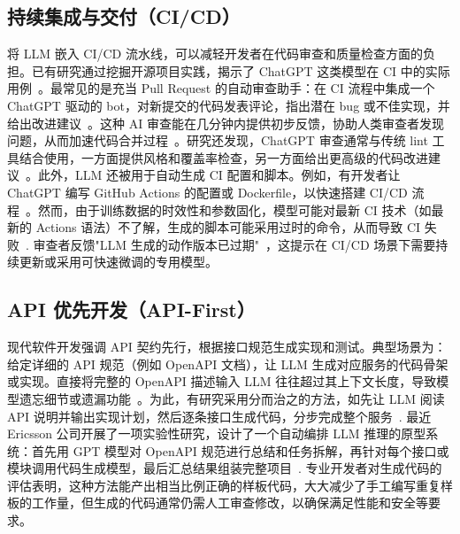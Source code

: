 \subsection{持续集成与交付（CI/CD）}

将 LLM 嵌入 CI/CD 流水线，可以减轻开发者在代码审查和质量检查方面的负担。已有研究通过挖掘开源项目实践，揭示了 ChatGPT 这类模型在 CI 中的实际用例~\cite{ChatGPTUsage2023}。最常见的是充当 Pull Request 的自动审查助手：在 CI 流程中集成一个 ChatGPT 驱动的 bot，对新提交的代码发表评论，指出潜在 bug 或不佳实现，并给出改进建议~\cite{ChatGPTUsage2023}。这种 AI 审查能在几分钟内提供初步反馈，协助人类审查者发现问题，从而加速代码合并过程~\cite{ChatGPTUsage2023}。研究还发现，ChatGPT 审查通常与传统 lint 工具结合使用，一方面提供风格和覆盖率检查，另一方面给出更高级的代码改进建议~\cite{ChatGPTUsage2023}。此外，LLM 还被用于自动生成 CI 配置和脚本。例如，有开发者让 ChatGPT 编写 GitHub Actions 的配置或 Dockerfile，以快速搭建 CI/CD 流程~\cite{ChatGPTUsage2023}。然而，由于训练数据的时效性和参数固化，模型可能对最新 CI 技术（如最新的 Actions 语法）不了解，生成的脚本可能采用过时的命令，从而导致 CI 失败~\cite{ChatGPTUsage2023}. 审查者反馈"LLM 生成的动作版本已过期"~\cite{ChatGPTUsage2023}，这提示在 CI/CD 场景下需要持续更新或采用可快速微调的专用模型。

\subsection{API 优先开发（API-First）}

现代软件开发强调 API 契约先行，根据接口规范生成实现和测试。典型场景为：给定详细的 API 规范（例如 OpenAPI 文档），让 LLM 生成对应服务的代码骨架或实现。直接将完整的 OpenAPI 描述输入 LLM 往往超过其上下文长度，导致模型遗忘细节或遗漏功能~\cite{DivaCopilot}。为此，有研究采用分而治之的方法，如先让 LLM 阅读 API 说明并输出实现计划，然后逐条接口生成代码，分步完成整个服务~\cite{DivaCopilot}. 最近 Ericsson 公司开展了一项实验性研究，设计了一个自动编排 LLM 推理的原型系统：首先用 GPT 模型对 OpenAPI 规范进行总结和任务拆解，再针对每个接口或模块调用代码生成模型，最后汇总结果组装完整项目~\cite{DivaCopilot,DivaCopilot}. 专业开发者对生成代码的评估表明，这种方法能产出相当比例正确的样板代码，大大减少了手工编写重复样板的工作量，但生成的代码通常仍需人工审查修改，以确保满足性能和安全等要求。
